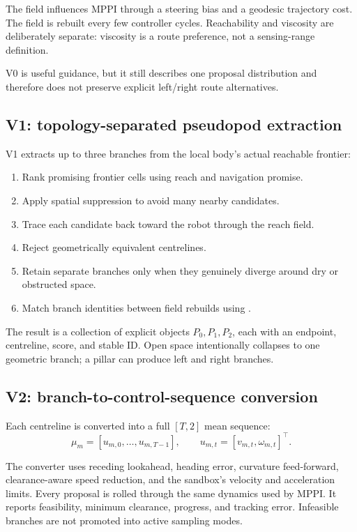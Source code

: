 \documentclass[11pt,a4paper]{article}
\newcommand{\code}[1]{\texttt{\detokenize{#1}}}
\begin{document}
The field influences MPPI through a steering bias and a geodesic trajectory
cost. The field is rebuilt every few controller cycles. Reachability and
viscosity are deliberately separate: viscosity is a route preference, not a
sensing-range definition.

V0 is useful guidance, but it still describes one proposal distribution and
therefore does not preserve explicit left/right route alternatives.

\subsection{V1: topology-separated pseudopod extraction}

V1 extracts up to three branches from the local body's actual reachable
frontier:

\begin{enumerate}[leftmargin=*]
  \item Rank promising frontier cells using reach and navigation promise.
  \item Apply spatial suppression to avoid many nearby candidates.
  \item Trace each candidate back toward the robot through the reach field.
  \item Reject geometrically equivalent centrelines.
  \item Retain separate branches only when they genuinely diverge around dry
  or obstructed space.
  \item Match branch identities between field rebuilds using
  \code{BranchTracker}.
\end{enumerate}

The result is a collection of explicit objects $P_0,P_1,P_2$, each with an
endpoint, centreline, score, and stable ID. Open space intentionally collapses
to one geometric branch; a pillar can produce left and right branches.

\subsection{V2: branch-to-control-sequence conversion}

Each centreline is converted into a full $[T,2]$ mean sequence:
\begin{equation}
  \mu_m = [u_{m,0},\ldots,u_{m,T-1}], \qquad
  u_{m,t}=[v_{m,t},\omega_{m,t}]^\top.
\end{equation}

The converter uses receding lookahead, heading error, curvature feed-forward,
clearance-aware speed reduction, and the sandbox's velocity and acceleration
limits. Every proposal is rolled through the same dynamics used by MPPI.
It reports feasibility, minimum clearance, progress, and tracking error.
Infeasible branches are not promoted into active sampling modes.
\end{document}
